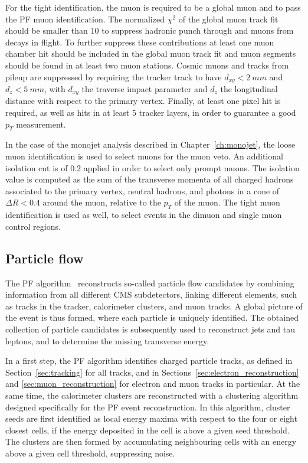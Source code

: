 For the tight identification, the muon is required to be a global muon and to pass the \ac{PF} muon identification. The normalized $\chi^2$ of the global muon track fit should be smaller than 10 to suppress hadronic punch through and muons from decays in flight. To further suppress these contributions at least one muon chamber hit should be included in the global muon track fit and muon segments should be found in at least two muon stations. Cosmic muons and tracks from pileup are suppressed by requiring the tracker track to have $d_{xy} < \SI{2}{mm}$ and $d_z < \SI{5}{mm}$, with $d_{xy}$ the traverse impact parameter and $d_z$ the longitudinal distance with respect to the primary vertex. Finally, at least one pixel hit is required, as well as hits in at least 5 tracker layers, in order to guarantee a good $p_T$ measurement.

In the case of the monojet analysis described in Chapter~\ref{ch:monojet}, the loose muon identification is used to select muons for the muon veto. An additional isolation cut is of 0.2 applied in order to select only prompt muons. The isolation value is computed as the sum of the transverse momenta of all charged hadrons associated to the primary vertex, neutral hadrons, and photons in a cone of $\Delta R < 0.4$ around the muon, relative to the $p_T$ of the muon. The tight muon identification is used as well, to select events in the dimuon and single muon control regions. 

\subsection{Particle flow}
\label{sec:PF}

The \acf{PF} algorithm~\cite{CMS-PRF-14-001} reconstructs so-called particle flow candidates by combining information from all different \ac{CMS} subdetectors, linking different elements, such as tracks in the tracker, calorimeter clusters, and muon tracks. A global picture of the event is thus formed, where each particle is uniquely identified. The obtained collection of particle candidates is subsequently used to reconstruct jets and tau leptons, and to determine the missing transverse energy.

In a first step, the \ac{PF} algorithm identifies charged particle tracks, as defined in Section~\ref{sec:tracking} for all tracks, and in Sections~\ref{sec:electron_reconstruction} and \ref{sec:muon_reconstruction} for electron and muon tracks in particular. At the same time, the calorimeter clusters are reconstructed with a clustering algorithm designed specifically for the \ac{PF} event reconstruction. In this algorithm, cluster seeds are first identified as local energy maxima with respect to the four or eight closest cells, if the energy deposited in the cell is above a given seed threshold. The clusters are then formed by accumulating neighbouring cells with an energy above a given cell threshold, suppressing noise.

